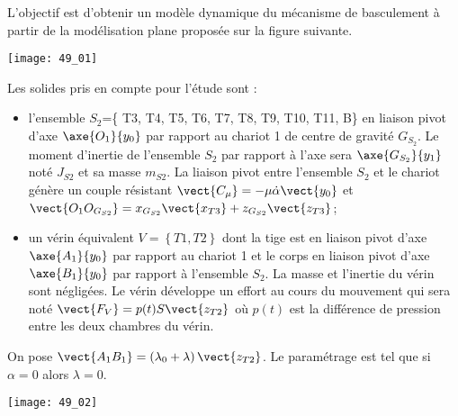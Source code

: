 \normalfalse \difficiletrue \tdifficilefalse
\correctionfalse



\setcounter{question}{0}
\ifcorrection
\else
{}
\fi

\ifprof
\else

L’objectif est d’obtenir un modèle dynamique du mécanisme de basculement à partir de la modélisation plane proposée sur la figure suivante.


\begin{center}
\texttt{[image: 49\_01]}
\end{center}

Les solides pris en compte pour l’étude sont :
\begin{itemize}
\item l'ensemble $S_2$=\{ T3, T4, T5, T6, T7, T8, T9, T10, T11, B\} en liaison pivot d'axe $\axe{O_1}{y_0}$ par rapport au chariot 1 de centre de gravité $G_{S_2}$. Le moment d’inertie de l’ensemble $S_2$ par rapport à l’axe sera $\axe{G_{S_2}}{y_1}$ noté $J_{S2}$ et sa masse $m_{S2}$. La liaison pivot entre l’ensemble $S_2$ et le chariot génère un couple résistant $\vect{C_{\mu}}=-\mu\dot{\alpha}\vect{y_0}$ et $\vect{O_1O_{G_{S2}}}=x_{G_{S2}} \vect{x_{T3}}+z_{G_{S2}} \vect{z_{T3}}$; 
\item un vérin équivalent $V=\left\{ T1,T2\right\}$ dont la tige est en liaison pivot d’axe $\axe{A_1}{y_0}$ par rapport au chariot 1 et le corps en liaison pivot d’axe $\axe{B_1}{y_0}$ par rapport à l’ensemble $S_2$. La masse et l’inertie du vérin sont négligées. Le vérin développe un effort au cours du mouvement qui sera noté $\vect{F_V} = p(t) S \vect{z_{T2}}$ où $p(t)$ est la différence de pression entre les deux chambres du vérin.
\end{itemize}


On pose $\vect{A_1B_1} = \left( \lambda_0+\lambda\right)\vect{z_{T2}}$. Le paramétrage est tel que si $\alpha=0$ alors $\lambda=0$.
\fi



\ifprof
\begin{center}
\texttt{[image: 49\_02]}
\end{center}

